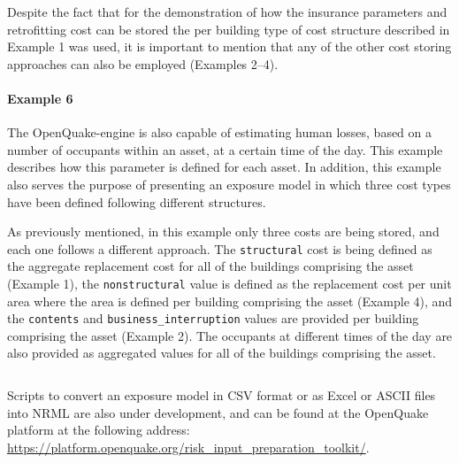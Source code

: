Despite the fact that for the demonstration of how the insurance parameters
and retrofitting cost can be stored the per building type of cost structure
described in Example 1 was used, it is important to mention that any of the
other cost storing approaches can also be employed (Examples 2--4).


\paragraph{Example 6}

The OpenQuake-engine is also capable of estimating human losses, based on a
number of occupants within an asset, at a certain time of the day. This
example describes how this parameter is defined for each asset. In addition,
this example also serves the purpose of presenting an \gls{exposure model} in
which three cost types have been defined following different structures.

As previously mentioned, in this example only three costs are being stored,
and each one follows a different approach. The \Verb+structural+ cost is being
defined as the aggregate replacement cost for all of the buildings comprising
the asset (Example 1), the \Verb+nonstructural+ value is defined as the
replacement cost per unit area where the area is defined per building
comprising the asset (Example 4), and the \Verb+contents+ and
\Verb+business_interruption+ values are provided per building comprising the
asset (Example 2). The  occupants at different times of the day are also
provided as aggregated values for all of the buildings comprising the asset.

\inputminted[firstline=1,firstnumber=1,fontsize=\footnotesize,frame=single,linenos,bgcolor=lightgray]{xml}{oqum/risk/Verbatim/input_exposure_occupants.xml}


Scripts to convert an \gls{exposure model} in CSV format or as Excel or
ASCII files into NRML are also under development, and can be found at the
OpenQuake platform at the following address:
\href{https://platform.openquake.org/risk_input_preparation_toolkit/}{https://platform.openquake.org/risk\_input\_preparation\_toolkit/}.